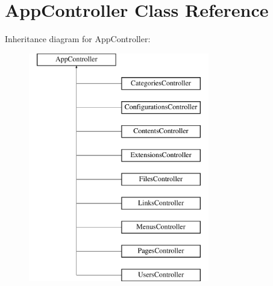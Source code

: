 \hypertarget{class_app_controller}{
\section{\-App\-Controller \-Class \-Reference}
\label{class_app_controller}
}
\-Inheritance diagram for \-App\-Controller\-:\begin{figure}[H]
\begin{center}
\leavevmode
\includegraphics[height=10.000000cm]{class_app_controller}
\end{center}
\end{figure}
